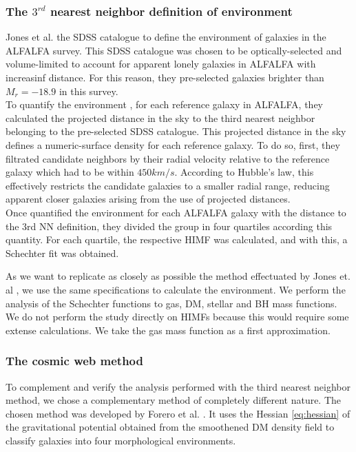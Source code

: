 \documentclass[a4paper,fleqn,usenatbib]{mnras}
\begin{document}
\subsubsection{The $3^{rd}$ nearest neighbor definition of environment}

Jones et al. \cite{Jones2016} the SDSS \cite{SDSS2011} catalogue to define the environment of galaxies in the ALFALFA \cite{ALFALFA} survey.
This SDSS catalogue was chosen to be optically-selected and volume-limited to account for apparent lonely galaxies in ALFALFA with increasinf distance. 
For this reason, they pre-selected galaxies brighter than $M_r = -18.9$ in this survey.\\

To quantify the environment , for each reference galaxy in ALFALFA, they calculated the projected distance in the sky to the third nearest neighbor belonging to the pre-selected SDSS catalogue.
This projected distance in the sky defines a numeric-surface density for each reference galaxy.
To do so, first, they filtrated candidate neighbors by their radial velocity relative to the reference galaxy which had to be within $450km/s$.
According to Hubble's law, this effectively restricts the candidate galaxies to a smaller radial range, reducing apparent closer galaxies arising from the use of projected distances. \\

Once quantified the environment for each ALFALFA galaxy with the distance to the 3rd NN definition, they divided the group in four quartiles according this quantity. 
For each quartile, the respective HIMF was calculated, and with this, a Schechter fit was obtained. 
 
As we want to replicate as closely as possible the method effectuated by Jones et. al \cite{Jones2016}, we use the same specifications to calculate the environment.
We perform the analysis of the Schechter functions to gas, DM, stellar and BH mass functions.
We do not perform the study directly on HIMFs because this would require some extense calculations. We take the gas mass function as a first approximation.\\

\subsubsection{The cosmic web method}
To complement and verify the analysis performed with the third nearest neighbor method, we chose a complementary method of completely different nature. 
The chosen method was developed by Forero et al. \cite{Forero2009}. 
It uses the Hessian \ref{eq:hessian} of the gravitational potential obtained from the smoothened DM density field to classify galaxies into four morphological environments.\\  
\end{document}

